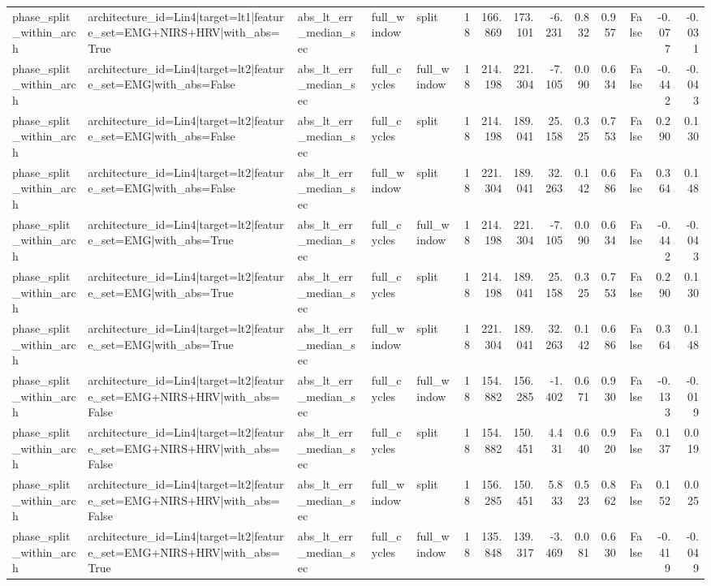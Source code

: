 \begin{table}
\begin{tabular}{lllllrrrrrrrrr}
phase_split_within_arch & architecture_id=Lin4|target=lt1|feature_set=EMG+NIRS+HRV|with_abs=True & abs_lt_err_median_sec & full_window & split & 18 & 166.869 & 173.101 & -6.231 & 0.832 & 0.957 & False & -0.077 & -0.031 \\
phase_split_within_arch & architecture_id=Lin4|target=lt2|feature_set=EMG|with_abs=False & abs_lt_err_median_sec & full_cycles & full_window & 18 & 214.198 & 221.304 & -7.105 & 0.090 & 0.634 & False & -0.442 & -0.043 \\
phase_split_within_arch & architecture_id=Lin4|target=lt2|feature_set=EMG|with_abs=False & abs_lt_err_median_sec & full_cycles & split & 18 & 214.198 & 189.041 & 25.158 & 0.325 & 0.753 & False & 0.290 & 0.130 \\
phase_split_within_arch & architecture_id=Lin4|target=lt2|feature_set=EMG|with_abs=False & abs_lt_err_median_sec & full_window & split & 18 & 221.304 & 189.041 & 32.263 & 0.142 & 0.686 & False & 0.364 & 0.148 \\
phase_split_within_arch & architecture_id=Lin4|target=lt2|feature_set=EMG|with_abs=True & abs_lt_err_median_sec & full_cycles & full_window & 18 & 214.198 & 221.304 & -7.105 & 0.090 & 0.634 & False & -0.442 & -0.043 \\
phase_split_within_arch & architecture_id=Lin4|target=lt2|feature_set=EMG|with_abs=True & abs_lt_err_median_sec & full_cycles & split & 18 & 214.198 & 189.041 & 25.158 & 0.325 & 0.753 & False & 0.290 & 0.130 \\
phase_split_within_arch & architecture_id=Lin4|target=lt2|feature_set=EMG|with_abs=True & abs_lt_err_median_sec & full_window & split & 18 & 221.304 & 189.041 & 32.263 & 0.142 & 0.686 & False & 0.364 & 0.148 \\
phase_split_within_arch & architecture_id=Lin4|target=lt2|feature_set=EMG+NIRS+HRV|with_abs=False & abs_lt_err_median_sec & full_cycles & full_window & 18 & 154.882 & 156.285 & -1.402 & 0.671 & 0.930 & False & -0.133 & -0.019 \\
phase_split_within_arch & architecture_id=Lin4|target=lt2|feature_set=EMG+NIRS+HRV|with_abs=False & abs_lt_err_median_sec & full_cycles & split & 18 & 154.882 & 150.451 & 4.431 & 0.640 & 0.920 & False & 0.137 & 0.019 \\
phase_split_within_arch & architecture_id=Lin4|target=lt2|feature_set=EMG+NIRS+HRV|with_abs=False & abs_lt_err_median_sec & full_window & split & 18 & 156.285 & 150.451 & 5.833 & 0.523 & 0.862 & False & 0.152 & 0.025 \\
phase_split_within_arch & architecture_id=Lin4|target=lt2|feature_set=EMG+NIRS+HRV|with_abs=True & abs_lt_err_median_sec & full_cycles & full_window & 18 & 135.848 & 139.317 & -3.469 & 0.081 & 0.630 & False & -0.419 & -0.049 \\

\end{tabular}
\end{table}
